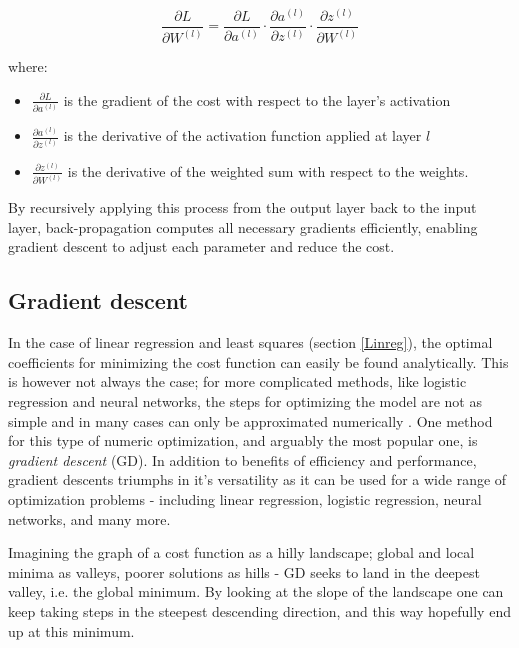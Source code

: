 \begin{equation}
\frac{\partial L}{\partial W^{(l)}} = \frac{\partial L}{\partial a^{(l)}} \cdot \frac{\partial a^{(l)}}{\partial z^{(l)}} \cdot \frac{\partial z^{(l)}}{\partial W^{(l)}}
\end{equation}

where:
\begin{itemize}[label=--]
    \item $\frac{\partial L}{\partial a^{(l)}}$ is the gradient of the cost with respect to the layer’s activation
    \item $\frac{\partial a^{(l)}}{\partial z^{(l)}}$ is the derivative of the activation function applied at layer $l$
    \item $\frac{\partial z^{(l)}}{\partial W^{(l)}}$ is the derivative of the weighted sum with respect to the weights.
\end{itemize}

By recursively applying this process from the output layer back to the input layer, back-propagation computes all necessary gradients efficiently, enabling gradient descent to adjust each parameter and reduce the cost.

\subsection{Gradient descent } \label{sec:gd}
In the case of linear regression and least squares (section \ref{Linreg}), the optimal coefficients for minimizing the cost function can easily be found analytically. This is however not always the case; for more complicated methods, like logistic regression and neural networks, the steps for optimizing the model are not as simple and in many cases can only be approximated numerically \citep[Week 40]{morten}.  
One method for this type of numeric optimization, and arguably the most popular one, is \textit{gradient descent} (GD). In addition to benefits of efficiency and performance, gradient descents triumphs in it's versatility as it can be used for a wide range of optimization problems - including linear regression, logistic regression, neural networks, and many more. 


Imagining the graph of a cost function as a hilly landscape; global and local minima as valleys, poorer solutions as hills - GD seeks to land in the deepest valley, i.e. the global minimum. 
By looking at the slope of the landscape one can keep taking steps in the steepest descending direction, and this way hopefully end up at this minimum.

